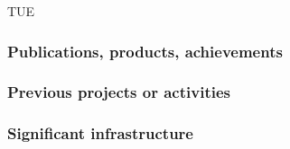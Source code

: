 \begin{sitedescription}{TUE}
\subsubsection*{Publications, products, achievements}

\begin{compactenum}
\item {}
\end{compactenum}

\subsubsection*{Previous projects or activities}

\begin{compactenum}
\item {}
\end{compactenum}

\subsubsection*{Significant infrastructure}

\end{sitedescription}

